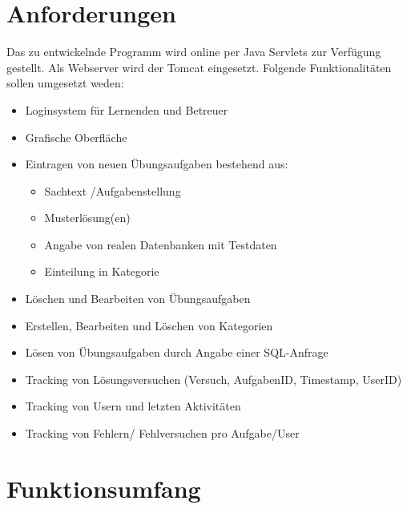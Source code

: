 \section{Anforderungen}

Das zu entwickelnde Programm wird online per Java Servlets zur Verfügung gestellt. Als Webserver wird der Tomcat eingesetzt. Folgende Funktionalitäten sollen umgesetzt weden:

\begin{itemize}
\item Loginsystem für Lernenden und Betreuer
\item Grafische Oberfläche
\item Eintragen von neuen Übungsaufgaben bestehend aus:
	\begin{itemize}
	\item Sachtext /Aufgabenstellung
	\item Musterlösung(en)
	\item Angabe von realen Datenbanken mit Testdaten
	\item Einteilung in Kategorie
	\end{itemize}
\item Löschen und Bearbeiten von Übungsaufgaben
\item Erstellen, Bearbeiten und Löschen von Kategorien
\item Lösen von Übungsaufgaben durch Angabe einer SQL-Anfrage
\item Tracking von Lösungsversuchen (Versuch, AufgabenID, Timestamp, UserID)
\item Tracking von Usern und letzten Aktivitäten
\item Tracking von Fehlern/ Fehlversuchen pro Aufgabe/User
\end{itemize}

\section{Funktionsumfang}